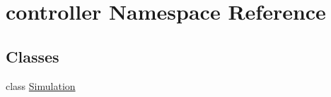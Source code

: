 \hypertarget{namespacecontroller}{\section{controller Namespace Reference}
\label{namespacecontroller}
}
\subsection*{Classes}
\begin{DoxyCompactItemize}
\item 
class \hyperlink{classcontroller_1_1Simulation}{Simulation}
\end{DoxyCompactItemize}

